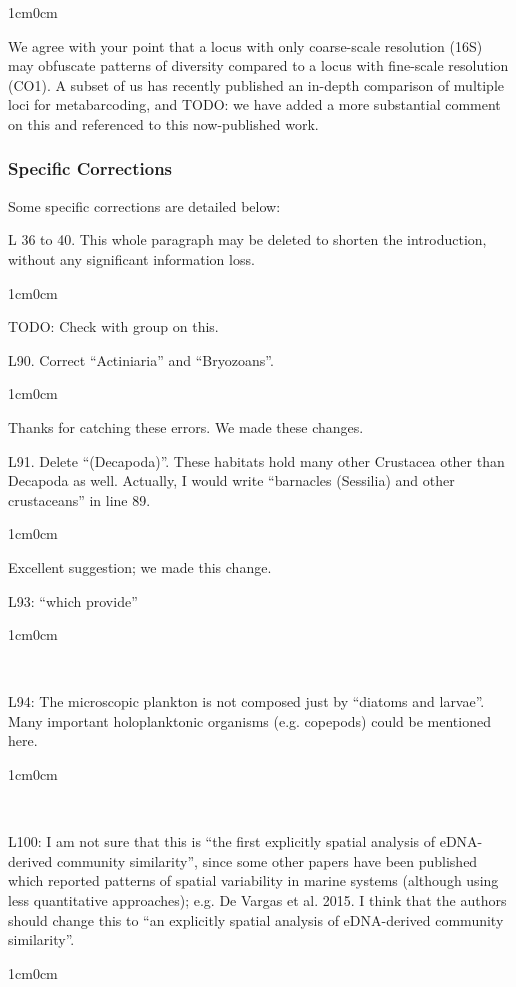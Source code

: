 \documentclass{article}
\newenvironment{response}
	{
	\begin{adjustwidth}{1cm}{0cm}
	\itshape %
	}
	{
	\end{adjustwidth}
	}
\begin{document}
\begin{response}
	We agree with your point that a locus with only coarse-scale resolution (16S) may obfuscate patterns of diversity compared to a locus with fine-scale resolution (CO1). A subset of us has recently published an in-depth comparison of multiple loci for metabarcoding, and TODO: we have added a more substantial comment on this and referenced to this now-published work.
\\
\end{response}

\subsubsection*{Specific Corrections}
Some specific corrections are detailed below:

L 36 to 40. This whole paragraph may be deleted to shorten the introduction, without any significant information loss.
\begin{response}
  TODO: Check with group on this.\\
\end{response}

L90. Correct “Actiniaria” and “Bryozoans”.
\begin{response}
  Thanks for catching these errors. We made these changes.\\
\end{response}

L91. Delete “(Decapoda)”. These habitats hold many other Crustacea other than Decapoda as well. Actually, I would write “barnacles (Sessilia) and other crustaceans” in line 89.
\begin{response}
  Excellent suggestion; we made this change.\\
\end{response}

L93: “which provide”
\begin{response}
  \\
\end{response}

L94: The microscopic plankton is not composed just by “diatoms and larvae”. Many important holoplanktonic organisms (e.g. copepods) could be mentioned here.
\begin{response}
  \\
\end{response}

L100: I am not sure that this is “the first explicitly spatial analysis of eDNA-derived community similarity”, since some other papers have been published which reported patterns of spatial variability in marine systems (although using less quantitative approaches); e.g. De Vargas et al. 2015. I think that the authors should change this to “an explicitly spatial analysis of eDNA-derived community similarity”.
\begin{response}
  \\
\end{response}
\end{document}

